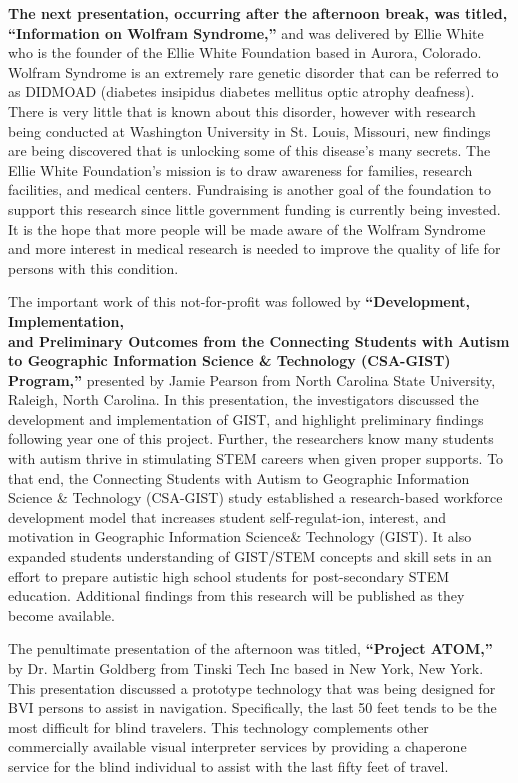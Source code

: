 \documentclass[11.5pt]{sig-alternate}
\begin{document}
\begin{large}
\textbf{The next presentation, occurring after the afternoon break, was titled, “Information on Wolfram Syndrome,”} and was delivered by Ellie White who is the founder of the Ellie White Foundation based in  Aurora, Colorado. Wolfram Syndrome is an extremely rare genetic disorder that can be referred to as DIDMOAD (diabetes insipidus diabetes mellitus optic atrophy deafness). There is very little that is known about this disorder, however with research being conducted at Washington University in St. Louis, Missouri, new findings are being discovered that is unlocking some of this disease’s many secrets. The Ellie White Foundation’s mission is to draw awareness for families, research facilities, and medical centers. Fundraising is another goal of the foundation to support this research since little government funding is currently being invested.  It is the hope that more people will be made aware of the Wolfram Syndrome and more interest in medical research is needed to improve the quality of life for persons with this condition.

The important work of this not-for-profit was followed by \textbf{“Development, Implementation, \\and Preliminary Outcomes from the Connecting Students with Autism to Geographic Information Science \& Technology (CSA-GIST) Program,”} presented by Jamie Pearson from North Carolina State University, Raleigh, North Carolina. In this presentation, the investigators discussed the development and implementation of GIST, and highlight preliminary findings following year one of this project.  Further, the researchers know many students with autism thrive in stimulating STEM careers when given proper supports. To that end, the Connecting Students with Autism to Geographic Information Science \& Technology (CSA-GIST) study established a research-based workforce development model that increases student self-regulat-ion, interest, and motivation in Geographic Information Science\& Technology (GIST). It also expanded students understanding of GIST/STEM concepts and skill sets in an effort to prepare autistic high school students for post-secondary STEM education. Additional findings from this research will be published as they become available.

The penultimate presentation of the afternoon was titled, \textbf{“Project ATOM,”} by Dr. Martin Goldberg from Tinski Tech Inc based in New York, New York. This presentation discussed a prototype technology that was being designed for BVI persons to assist in navigation. Specifically, the last 50 feet tends to be the most difficult for blind travelers. This technology complements other commercially available visual interpreter services by providing a chaperone service for the blind individual to assist with the last fifty feet of travel.


\end{large}
\end{document}
